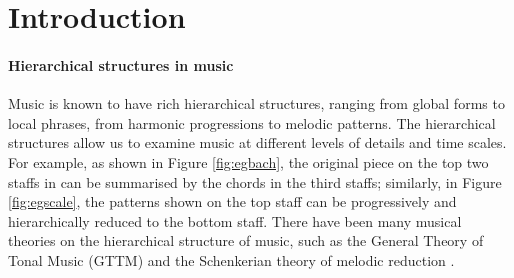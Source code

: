 \documentclass[acmsmall,10pt]{acmart}%
\begin{document}


\maketitle

%
%
\section{Introduction}
\label{sec:intro}



\paragraph{Hierarchical structures in music}
Music is known to have rich hierarchical structures, ranging from global forms to local phrases, from harmonic progressions to melodic patterns. The hierarchical structures allow us to examine music at different levels of details and time scales. For example, as shown in Figure \ref{fig:egbach}, the original piece on the
top two staffs in
can be summarised by the chords in the third staffs; similarly, in Figure
\ref{fig:egscale}, the patterns
shown on the top staff can be progressively and hierarchically reduced to the
bottom staff. There have been many musical theories on the hierarchical
structure of music, such as the
General Theory of Tonal Music (GTTM) \cite{lerdahl1985generative} and the Schenkerian theory of melodic reduction
\cite{forte1959schenker}.
\end{document}
